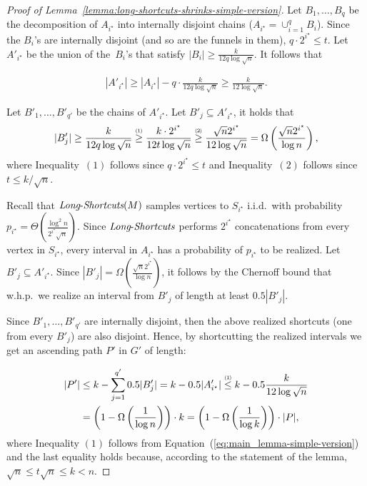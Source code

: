 \documentclass[11pt]{article}
\newcommand{\LS}{\mbox{{\it Long}-{\it Shortcuts}}}
\newcommand\numge[1]{\stackrel{\scriptscriptstyle(\mkern-1.5mu#1\mkern-1.5mu)}{\ge}}
\newcommand\numle[1]{\stackrel{\scriptscriptstyle(\mkern-1.5mu#1\mkern-1.5mu)}{\le}}
\begin{document}
\begin{proof}[Proof of Lemma~\ref{lemma:long-shortcuts-shrinks-simple-version}]
   Let $B_1,\ldots, B_q$ be the decomposition of  $A_{i^\star} $ into internally disjoint chains ($A_{i^\star}= \cup_{i=1}^{q} B_i$). Since the $B_i$'s are internally disjoint (and so are the funnels in them), $q\cdot 2^{i^\star} \le t$.  
   Let $A'_{i^\star}$ be the union of the~$B_i$'s that satisfy $|B_i| \ge \frac{k}{12q \log  \sqrt{n}}$.
   It follows that

    \begin{align}\label{eq:main_lemma-simple-version}
        |A'_{i^\star}| 
    \ge  |A_{i^\star}| - q \cdot \frac{k}{12q \log  \sqrt{n}}
    \ge \frac{k}{12 \log \sqrt{n}}.
    \end{align}

    Let $B'_1,\ldots, B'_{q'} $ be the chains of $A'_{i^\star}$.  Let $B'_j \subseteq A'_{i^\star}$, it holds that
    \begin{align*}
        |B'_j| \ge \frac{k}{12q \log \sqrt{n}} \numge{1} \frac{k \cdot 2^{i^\star}}{12t \log \sqrt{n}} \numge{2} \frac{\sqrt{n} 2^{i^\star}}{12 \log \sqrt{n}} = \Omega \left( \frac{\sqrt{n} 2^{i^\star}}{\log n} \right),
    \end{align*}
    where Inequality~$(1)$ follows since $q\cdot 2^{i^\star}\le t$ and Inequality~$(2)$ follows since $t \le k / \sqrt{n}$. 
     
     Recall that $\LS(M)$ samples vertices to $S_{i^\star}$ i.i.d.\ with probability $p_{i^\star}=\Theta(\frac{\log^2 n}{2^{i^\star}\sqrt{n}})$. Since $\LS$ performs $2^{i^\star}$ concatenations from every vertex in $S_{i^\star}$, 
     every interval in $A_{i^\star}$ has a probability of $p_{i^\star}$ to be realized. 
     Let $B'_j \subseteq A'_{i^\star}$. 
    Since  $|B'_j| = \Omega 
    \left( \frac{\sqrt{n} 2^{i^\star}}{ \log n} \right)$, it follows by the Chernoff bound that w.h.p.\ we realize an interval from $B'_j$ of length at least $0.5 |B'_j|$.

    Since $B'_1,\ldots, B'_{q'} $ are internally disjoint, then the above realized shortcuts (one from every $B'_j$) are also disjoint. Hence, by shortcutting the realized intervals we get an ascending path $P'$ in $G'$ of length:
    
    \begin{align*}
       |P'| & \le k - \sum_{j=1}^{q'} {0.5 |B'_j|} =
       k - 0.5 |A'_{i^\star}| 
       \numle{1} k -0.5 \frac{k}{12\log \sqrt{n}} \\&= 
       \left(1 - \Omega\left(\frac{1}{\log n} \right) \right) \cdot k = 
       \left(1 - \Omega\left(\frac{1}{\log k} \right) \right) \cdot |P|,
    \end{align*}
    where Inequality $(1)$ follows from Equation~(\ref{eq:main_lemma-simple-version}) and the last equality holds because, according to the statement of the lemma, $\sqrt{n} \le t \sqrt{n} \le k < n$.
\end{proof}
\end{document}
